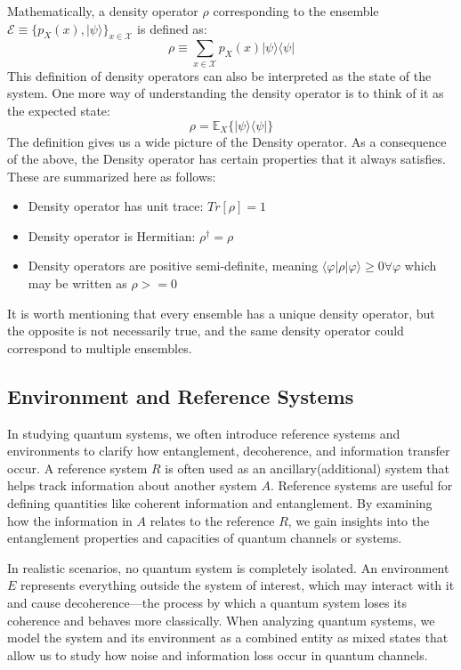 Mathematically, a density operator $\rho$ corresponding to the ensemble $\mathcal{E} \equiv
\{p_X(x), |\psi\rangle \}_{x \in \mathcal{X}}$ is defined as:
\begin{equation}
    \rho \equiv \displaystyle\sum_{x \in \mathcal{X} } p_X(x) |\psi \rangle \langle \psi|
\end{equation}
This definition of density operators can also be interpreted as the state of the system. One
more way of understanding the density operator is to think of it as the expected state:
\begin{equation}
    \rho = \mathbb{E}_X \{ |\psi \rangle \langle \psi| \}
\end{equation}
The definition gives us a wide picture of the Density operator. As a consequence of the above,
the Density operator has certain properties that it always satisfies. These are summarized here
as follows:
\begin{itemize}
    \item Density operator has unit trace: $Tr[\rho] = 1$
    \item Density operator is Hermitian: $\rho^\dagger = \rho$
    \item Density operators are positive semi-definite, meaning $\langle \varphi  | \rho | \varphi \rangle \geq 0
    \forall \varphi$ which may be written as $\rho >= 0$
\end{itemize}
It is worth mentioning that every ensemble has a unique density operator, but the opposite
is not necessarily true, and the same density operator could correspond to multiple ensembles.

\subsection{Environment and Reference Systems}

In studying quantum systems, we often introduce reference systems and environments to clarify
how entanglement, decoherence, and information transfer occur. A reference system $R$ is often
used as an ancillary(additional) system that helps track information about another system $A$.
Reference systems are useful for defining quantities like coherent information and entanglement.
By examining how the information in $A$ relates to the reference $R$, we gain insights into the
entanglement properties and capacities of quantum channels or systems.

In realistic scenarios,
no quantum system is completely isolated. An environment $E$ represents everything outside the
system of interest, which may interact with it and cause decoherence—the process by which a quantum
system loses its coherence and behaves more classically. When analyzing quantum systems, we model
the system and its environment as a combined entity as mixed states that allow us to study how
noise and information loss occur in quantum channels.


